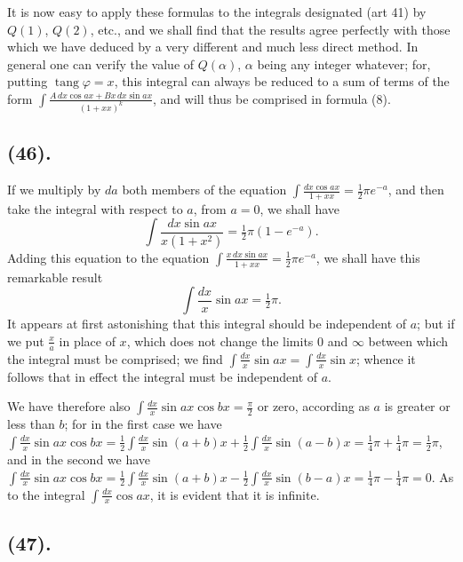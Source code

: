 \documentclass{article}
\begin{document}
It is now easy to apply these formulas to the integrals designated (art 41) by $Q(1)$, $Q(2)$, etc., and we shall find that the results agree perfectly with those which we have deduced by a very different and much less direct method. In general one can verify the value of $Q(\alpha)$, $\alpha$ being any integer whatever; for, putting $\operatorname{tang}\varphi=x$, this integral can always be reduced to a sum of terms of the form $\displaystyle\int\frac{A\,dx\cos ax+Bx\,dx\sin ax}{(1+xx)^{k}}$, and will thus be comprised in formula (8).

\subsection*{(46).}

If we multiply by $da$ both members of the equation $\displaystyle\int\frac{dx\cos ax}{1+xx}=\tfrac{1}{2}\pi e^{-a}$, and then take the integral with respect to $a$, from $a=0$, we shall have
\[ \int\frac{dx\sin ax}{x(1+x^{2})}=\tfrac{1}{2}\pi(1-e^{-a}). \]
Adding this equation to the equation $\displaystyle\int\frac{x\,dx\sin ax}{1+xx}=\tfrac{1}{2}\pi e^{-a}$, we shall have this remarkable result
\[ \int\frac{dx}{x}\sin ax=\tfrac{1}{2}\pi. \tag{9} \]
It appears at first astonishing that this integral should be independent of $a$; but if we put $\frac{x}{a}$ in place of $x$, which does not change the limits $0$ and $\infty$ between which the integral must be comprised; we find $\displaystyle\int\frac{dx}{x}\sin ax=\int\frac{dx}{x}\sin x$; whence it follows that in effect the integral must be independent of $a$.


We have therefore also $\displaystyle\int\frac{dx}{x}\sin ax\cos bx=\frac{\pi}{2}$ or zero, according as $a$ is greater or less than $b$; for in the first case we have $\displaystyle\int\frac{dx}{x}\sin ax\cos bx=\tfrac{1}{2}\int\frac{dx}{x}\sin(a+b)x+\tfrac{1}{2}\int\frac{dx}{x}\sin(a-b)x=\tfrac{1}{4}\pi+\tfrac{1}{4}\pi=\tfrac{1}{2}\pi$, and in the second we have $\displaystyle\int\frac{dx}{x}\sin ax\cos bx=\tfrac{1}{2}\int\frac{dx}{x}\sin(a+b)x-\tfrac{1}{2}\int\frac{dx}{x}\sin(b-a)x=\tfrac{1}{4}\pi-\tfrac{1}{4}\pi=0$. As to the integral $\displaystyle\int\frac{dx}{x}\cos ax$, it is evident that it is infinite.

\subsection*{(47).}
\end{document}
